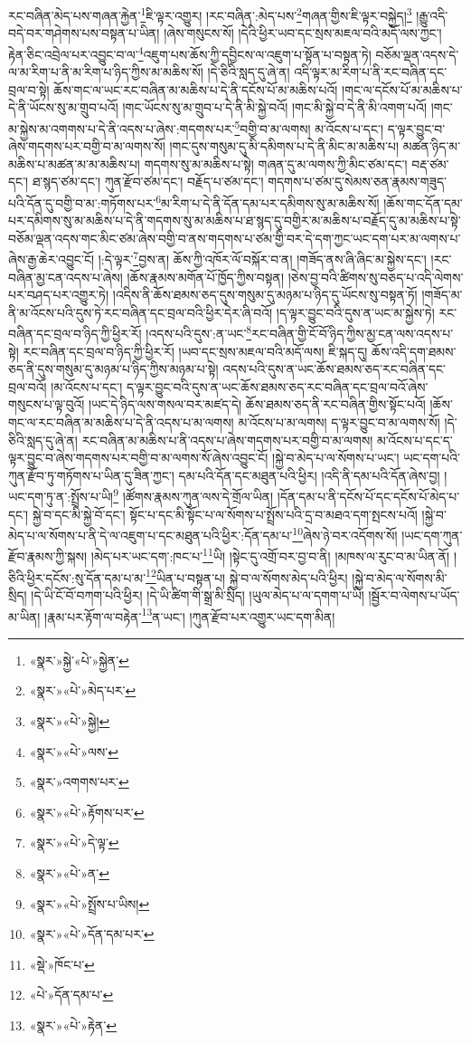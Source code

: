 རང་བཞིན་མེད་པས་གཞན་རྐྱེན་\footnote{«སྣར་»སྐྱེ་«པེ་»སྐྱེན་}ཇི་ལྟར་འགྱུར། །རང་བཞིན་:མེད་པས་\footnote{«སྣར་»«པེ་»མེད་པར་}གཞན་གྱིས་ཇི་ལྟར་བསྐྱེད།\footnote{«སྣར་»«པེ་»སྐྱེ།} །རྒྱུ་འདི་བདེ་བར་གཤེགས་པས་བསྟན་པ་ཡིན། །ཞེས་གསུངས་སོ། །དེའི་ཕྱིར་ཡབ་དང་སྲས་མཇལ་བའི་མདོ་ལས་ཀྱང་། རྟེན་ཅིང་འབྲེལ་པར་འབྱུང་བ་ལ་\footnote{«སྣར་»«པེ་»ལས་}འཇུག་པས་ཆོས་ཀྱི་དབྱིངས་ལ་འཇུག་པ་སྟོན་པ་བསྟན་ཏེ། བཅོམ་ལྡན་འདས་དེ་ལ་མ་རིག་པ་ནི་མ་རིག་པ་ཉིད་ཀྱིས་མ་མཆིས་སོ། །དེ་ཅིའི་སླད་དུ་ཞེ་ན། འདི་ལྟར་མ་རིག་པ་ནི་རང་བཞིན་དང་བྲལ་བ་སྟེ། ཆོས་གང་ལ་ཡང་རང་བཞིན་མ་མཆིས་པ་དེ་ནི་དངོས་པོ་མ་མཆིས་པའོ། །གང་ལ་དངོས་པོ་མ་མཆིས་པ་དེ་ནི་ཡོངས་སུ་མ་གྲུབ་པའོ། །གང་ཡོངས་སུ་མ་གྲུབ་པ་དེ་ནི་མི་སྐྱེ་བའོ། །གང་མི་སྐྱེ་བ་དེ་ནི་མི་འགག་པའོ། །གང་མ་སྐྱེས་མ་འགགས་པ་དེ་ནི་འདས་པ་ཞེས་:གདགས་པར་\footnote{«སྣར་»འགགས་པར་}བགྱི་བ་མ་ལགས། མ་འོངས་པ་དང་། ད་ལྟར་བྱུང་བ་ཞེས་གདགས་པར་བགྱི་བ་མ་ལགས་སོ། །གང་དུས་གསུམ་དུ་མི་དམིགས་པ་དེ་ནི་མིང་མ་མཆིས་པ། མཚན་ཉིད་མ་མཆིས་པ་མཚན་མ་མ་མཆིས་པ། གདགས་སུ་མ་མཆིས་པ་སྟེ། གཞན་དུ་མ་ལགས་ཀྱི་མིང་ཙམ་དང་། བརྡ་ཙམ་དང་། ཐ་སྙད་ཙམ་དང་། ཀུན་རྫོབ་ཙམ་དང་། བརྗོད་པ་ཙམ་དང་། གདགས་པ་ཙམ་དུ་སེམས་ཅན་རྣམས་གཟུད་པའི་དོན་དུ་བགྱི་བ་མ་:གཏོགས་པར་\footnote{«སྣར་»«པེ་»རྟོགས་པར་}མ་རིག་པ་དེ་ནི་དོན་དམ་པར་དམིགས་སུ་མ་མཆིས་སོ། །ཆོས་གང་དོན་དམ་པར་དམིགས་སུ་མ་མཆིས་པ་དེ་ནི་གདགས་སུ་མ་མཆིས་པ་ཐ་སྙད་དུ་བགྱིར་མ་མཆིས་པ་བརྗོད་དུ་མ་མཆིས་པ་སྟེ་བཅོམ་ལྡན་འདས་གང་མིང་ཙམ་ཞེས་བགྱི་བ་ནས་གདགས་པ་ཙམ་གྱི་བར་དེ་དག་ཀྱང་ཡང་དག་པར་མ་ལགས་པ་ཞེས་རྒྱ་ཆེར་འབྱུང་ངོ། །:དེ་ལྟར་\footnote{«སྣར་»«པེ་»དེ་ལྟ་}བྱས་ན། ཆོས་ཀྱི་འཁོར་ལོ་བསྐོར་བ་ན། །གཟོད་ནས་ཞི་ཞིང་མ་སྐྱེས་དང་། །རང་བཞིན་མྱ་ངན་འདས་པ་ཞེས། །ཆོས་རྣམས་མགོན་པོ་ཁྱོད་ཀྱིས་བསྟན། །ཅེས་བྱ་བའི་ཚིགས་སུ་བཅད་པ་འདི་ལེགས་པར་བཤད་པར་འགྱུར་ཏེ། །འདིས་ནི་ཆོས་ཐམས་ཅད་དུས་གསུམ་དུ་མཉམ་པ་ཉིད་དུ་ཡོངས་སུ་བསྟན་ཏོ། །གཟོད་མ་ནི་མ་འོངས་པའི་དུས་ཏེ་རང་བཞིན་དང་བྲལ་བའི་ཕྱིར་དེར་ཞི་བའོ། །ད་ལྟར་བྱུང་བའི་དུས་ན་ཡང་མ་སྐྱེས་ཏེ། རང་བཞིན་དང་བྲལ་བ་ཉིད་ཀྱི་ཕྱིར་རོ། །འདས་པའི་དུས་:ན་ཡང་\footnote{«སྣར་»«པེ་»ན་}རང་བཞིན་གྱི་ངོ་བོ་ཉིད་ཀྱིས་མྱ་ངན་ལས་འདས་པ་སྟེ། རང་བཞིན་དང་བྲལ་བ་ཉིད་ཀྱི་ཕྱིར་རོ། །ཡབ་དང་སྲས་མཇལ་བའི་མདོ་ལས། ཇི་སྐད་དུ། ཆོས་འདི་དག་ཐམས་ཅད་ནི་དུས་གསུམ་དུ་མཉམ་པ་ཉིད་ཀྱིས་མཉམ་པ་སྟེ། འདས་པའི་དུས་ན་ཡང་ཆོས་ཐམས་ཅད་རང་བཞིན་དང་བྲལ་བའོ། །མ་འོངས་པ་དང་། ད་ལྟར་བྱུང་བའི་དུས་ན་ཡང་ཆོས་ཐམས་ཅད་རང་བཞིན་དང་བྲལ་བའོ་ཞེས་གསུངས་པ་ལྟ་བུའོ། །ཡང་དེ་ཉིད་ལས་གསལ་བར་མཛད་དེ། ཆོས་ཐམས་ཅད་ནི་རང་བཞིན་གྱིས་སྟོང་པའོ། །ཆོས་གང་ལ་རང་བཞིན་མ་མཆིས་པ་དེ་ནི་འདས་པ་མ་ལགས། མ་འོངས་པ་མ་ལགས། ད་ལྟར་བྱུང་བ་མ་ལགས་སོ། །དེ་ཅིའི་སླད་དུ་ཞེ་ན། རང་བཞིན་མ་མཆིས་པ་ནི་འདས་པ་ཞེས་གདགས་པར་བགྱི་བ་མ་ལགས། མ་འོངས་པ་དང་ད་ལྟར་བྱུང་བ་ཞེས་གདགས་པར་བགྱི་བ་མ་ལགས་སོ་ཞེས་འབྱུང་ངོ། །སྐྱེ་བ་མེད་པ་ལ་སོགས་པ་ཡང་། ཡང་དག་པའི་ཀུན་རྫོབ་ཏུ་གཏོགས་པ་ཡིན་དུ་ཟིན་ཀྱང་། དམ་པའི་དོན་དང་མཐུན་པའི་ཕྱིར། །འདི་ནི་དམ་པའི་དོན་ཞེས་བྱ། །ཡང་དག་ཏུ་ན་:སྤྲོས་པ་ཡི།\footnote{«སྣར་»«པེ་»སྤྲོས་པ་ཡིས།} །ཚོགས་རྣམས་ཀུན་ལས་དེ་གྲོལ་ཡིན། །དོན་དམ་པ་ནི་དངོས་པོ་དང་དངོས་པོ་མེད་པ་དང་། སྐྱེ་བ་དང་མི་སྐྱེ་བོ་དང་། སྟོང་པ་དང་མི་སྟོང་པ་ལ་སོགས་པ་སྤྲོས་པའི་དྲ་བ་མཐའ་དག་སྤངས་པའོ། །སྐྱེ་བ་མེད་པ་ལ་སོགས་པ་ནི་དེ་ལ་འཇུག་པ་དང་མཐུན་པའི་ཕྱིར་:དོན་དམ་པ་\footnote{«སྣར་»«པེ་»དོན་དམ་པར་}ཞེས་ཉེ་བར་འདོགས་སོ། །ཡང་དག་ཀུན་རྫོབ་རྣམས་ཀྱི་སྐས། །མེད་པར་ཡང་དག་:ཁང་པ་\footnote{«སྡེ་»ཁོང་པ་}ཡི། །སྟེང་དུ་འགྲོ་བར་བྱ་བ་ནི། །མཁས་ལ་རུང་བ་མ་ཡིན་ནོ། །ཅིའི་ཕྱིར་དངོས་:སུ་དོན་དམ་པ་མ་\footnote{«པེ་»དོན་དམ་པ་}ཡིན་པ་བསྟན་པ། སྐྱེ་བ་ལ་སོགས་མེད་པའི་ཕྱིར། །སྐྱེ་བ་མེད་ལ་སོགས་མི་སྲིད། །དེ་ཡི་ངོ་བོ་བཀག་པའི་ཕྱིར། །དེ་ཡི་ཚིག་གི་སྒྲ་མི་སྲིད། །ཡུལ་མེད་པ་ལ་དགག་པ་ཡི། །སྦྱོར་བ་ལེགས་པ་ཡོད་མ་ཡིན། །རྣམ་པར་རྟོག་ལ་བརྟེན་\footnote{«སྣར་»«པེ་»རྟེན་}ན་ཡང་། །ཀུན་རྫོབ་པར་འགྱུར་ཡང་དག་མིན། 